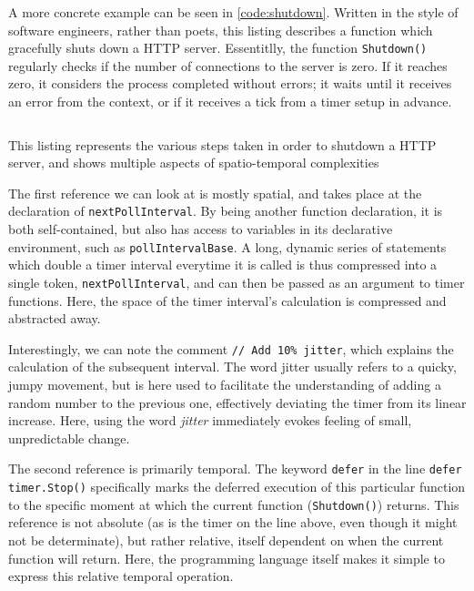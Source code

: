 A more concrete example can be seen in \ref{code:shutdown}. Written in the style of software engineers, rather than poets, this listing describes a function which gracefully shuts down a HTTP server. Essentitlly, the function \lstinline{Shutdown()} regularly checks if the number of connections to the server is zero. If it reaches zero, it considers the process completed without errors; it waits until it receives an error from the context, or if it receives a tick from a timer setup in advance.

\begin{listing}
    \inputminted[]{go}{./corpus/shutdown.go}
    \caption{This listing represents the various steps taken in order to shutdown a HTTP server, and shows multiple aspects of spatio-temporal complexities \citep{weidideng_caddyserver_2023}}
    \label{code:shutdown}
\end{listing}

The first reference we can look at is mostly spatial, and takes place at the declaration of \lstinline{nextPollInterval}. By being another function declaration, it is both self-contained, but also has access to variables in its declarative environment, such as \lstinline{pollIntervalBase}. A long, dynamic series of statements which double a timer interval everytime it is called is thus compressed into a single token, \lstinline{nextPollInterval}, and can then be passed as an argument to timer functions. Here, the space of the timer interval's calculation is compressed and abstracted away.

Interestingly, we can note the comment \lstinline{// Add 10% jitter}, which explains the calculation of the subsequent interval. The word jitter usually refers to a quicky, jumpy movement, but is here used to facilitate the understanding of adding a random number to the previous one, effectively deviating the timer from its linear increase. Here, using the word \emph{jitter} immediately evokes feeling of small, unpredictable change.

The second reference is primarily temporal. The keyword \lstinline{defer} in the line \lstinline{defer timer.Stop()} specifically marks the deferred execution of this particular function to the specific moment at which the current function (\lstinline{Shutdown()}) returns. This reference is not absolute (as is the timer on the line above, even though it might not be determinate), but rather relative, itself dependent on when the current function will return. Here, the programming language itself makes it simple to express this relative temporal operation.

